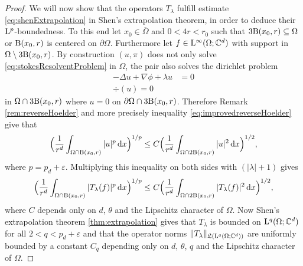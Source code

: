 \begin{proof}
  We will now show that the operators $T_\lambda$ fulfill estimate \eqref{eq:shenExtrapolation} in Shen's extrapolation theorem, in order to deduce their $\mathrm{L}^p$-boundedness.
  To this end let $x_0 \in \overline \Omega$ and $0 < 4r < r_0$ such that $3 \mathrm{B}(x_0, r) \subseteq \Omega$ or $\mathrm{B}(x_0, r)$ is centered on $\partial\Omega$.
  Furthermore let $f \in \mathrm{L}^\infty(\Omega; \mathbb{C}^d)$ with support in $\Omega \setminus 3 \mathrm{B}(x_0, r)$.
  By construction $(u,\pi)$ does not only solve \eqref{eq:stokesResolventProblem} in $\Omega$, the pair also solves the dirichlet problem
  \begin{align*}
    -\Delta u + \nabla \phi + \lambda u &= 0 \\
    \div(u) = 0
  \end{align*}
  in $\Omega \cap 3 \mathrm{B}(x_0, r)$ where $u = 0$ on $\partial\Omega \cap 3 \mathrm{B}(x_0, r)$.
  Therefore Remark \ref{rem:reverseHoelder} and more precisely inequality \eqref{eq:improvedreverseHoelder} give that
  \begin{align*}
    \Big( \frac{1}{r^d} \int_{\Omega \cap \mathrm{B}(x_0, r)} |u|^p \, {\operatorname{d}\!{x}} \Big)^{1/p} \leq C \Big( \frac{1}{r^d} \int_{\Omega \cap 2 \mathrm{B}(x_0, r)} |u|^2 \, {\operatorname{d}\!{x}} \Big)^{1/2},
  \end{align*}
  where $p = p_d + \varepsilon$.
  Multiplying this inequality on both sides with $(|\lambda| + 1)$ gives
  \begin{align}
    \label{eq:tlambdaEstimate}
    \Big( \frac{1}{r^d} \int_{\Omega \cap \mathrm{B}(x_0, r)} |T_\lambda(f)|^p \, {\operatorname{d}\!{x}} \Big)^{1/p} \leq C \Big( \frac{1}{r^d} \int_{\Omega \cap 2 \mathrm{B}(x_0, r)} |T_\lambda(f)|^2 \, {\operatorname{d}\!{x}} \Big)^{1/2},
  \end{align}
  where $C$ depends only on $d$, $\theta$ and the Lipschitz character of $\Omega$.
  Now Shen's extrapolation theorem \ref{thm:extrapolation} gives that $T_\lambda$ is bounded on $\mathrm{L}^q(\Omega; \mathbb{C}^d)$ for all $2 < q < p_d + \varepsilon$ and that the operator norms $\|T_\lambda\|_{\mathfrak{L}(\mathrm{L}^q(\Omega; \mathbb{C}^d))}$ are uniformly bounded by a constant $C_q$ depending only on $d$, $\theta$, $q$ and the Lipschitz character of $\Omega$.


\end{proof}
